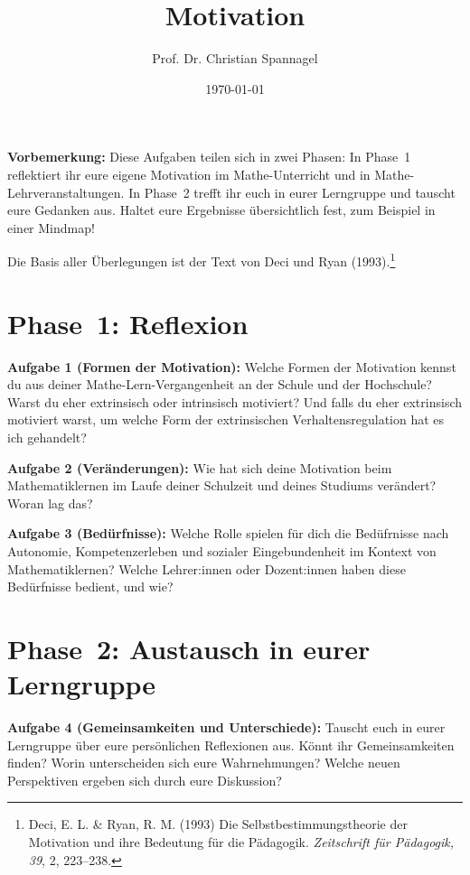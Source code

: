 \documentclass{../cssheet}
\title{Motivation}
\author{Prof. Dr. Christian Spannagel}
\date{\today}
\begin{document}
\printtitle

\textbf{Vorbemerkung:}  Diese Aufgaben teilen sich in zwei Phasen: In Phase~1 reflektiert ihr eure eigene Motivation im Mathe-Unterricht und in Mathe-Lehrveranstaltungen. In Phase~2 trefft ihr euch in eurer Lerngruppe und tauscht eure Gedanken aus. Haltet eure Ergebnisse übersichtlich fest, zum Beispiel in einer Mindmap!

Die Basis aller Überlegungen ist der Text von Deci und Ryan (1993).\footnote{Deci, E. L. \& Ryan, R. M. (1993) Die Selbstbestimmungstheorie der Motivation und ihre Bedeutung für die Pädagogik. \emph{Zeitschrift für Pädagogik, 39}, 2, 223--238.}

\section*{Phase~1: Reflexion}

\textbf{Aufgabe 1 (Formen der Motivation):}  Welche Formen der Motivation kennst du aus deiner \glqq{}Mathe-Lern-Vergangenheit\grqq{} an der Schule und der Hochschule? Warst du eher extrinsisch oder intrinsisch motiviert? Und falls du eher extrinsisch motiviert warst, um welche Form der extrinsischen Verhaltensregulation hat es ich gehandelt?

\textbf{Aufgabe 2 (Veränderungen):} Wie hat sich deine Motivation beim Mathematiklernen im Laufe deiner Schulzeit und deines Studiums verändert? Woran lag das?

\textbf{Aufgabe 3 (Bedürfnisse):}  Welche Rolle spielen für dich die Bedüfrnisse nach Autonomie, Kompetenzerleben und sozialer Eingebundenheit im Kontext von Mathematiklernen? Welche Lehrer:innen oder Dozent:innen haben diese Bedürfnisse bedient, und wie?



\section*{Phase~2: Austausch in eurer Lerngruppe}

\textbf{Aufgabe 4 (Gemeinsamkeiten und Unterschiede):} Tauscht euch in eurer Lerngruppe über eure persönlichen Reflexionen aus. Könnt ihr Gemeinsamkeiten finden? Worin unterscheiden sich eure Wahrnehmungen? Welche neuen Perspektiven ergeben sich durch eure Diskussion?


\vspace*{10mm}
\printlicense

\printsocials
\end{document}
